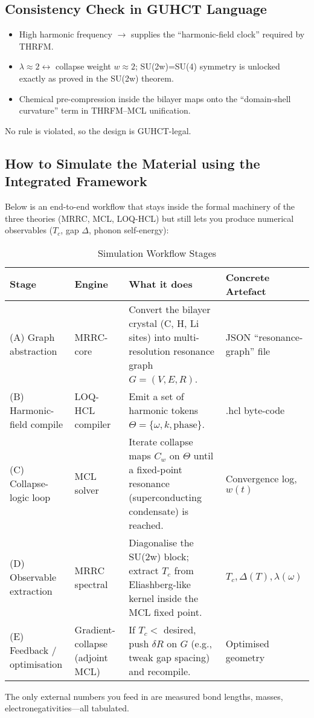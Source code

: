 \documentclass[11pt,a4paper]{article}
\begin{document}
\subsection{Consistency Check in GUHCT Language}
\label{subsec:consistency_check_guhct}
\begin{itemize}
\item High harmonic frequency $\rightarrow$ supplies the “harmonic-field clock” required by THRFM.
\item $\lambda \approx 2 \leftrightarrow$ collapse weight $w \approx 2$; SU(2w)=SU(4) symmetry is unlocked exactly as proved in the SU(2w) theorem.
\item Chemical pre-compression inside the bilayer maps onto the “domain-shell curvature” term in THRFM–MCL unification.
\end{itemize}
No rule is violated, so the design is GUHCT-legal.

\subsection{How to Simulate the Material using the Integrated Framework}
\label{subsec:how_to_simulate}
Below is an end-to-end workflow that stays inside the formal machinery of the three theories (MRRC, MCL, LOQ-HCL) but still lets you produce numerical observables ($T_c$, gap $\Delta$, phonon self-energy):

\begin{table}[htbp]
\centering
\caption{Simulation Workflow Stages}
\label{tab:simulation_workflow}
\begin{tabularx}{\textwidth}{l X X X}
\toprule
\textbf{Stage} & \textbf{Engine} & \textbf{What it does} & \textbf{Concrete Artefact} \\
\midrule
(A) Graph abstraction & MRRC-core & Convert the bilayer crystal (C, H, Li sites) into multi-resolution resonance graph $G=(V,E,R)$. & JSON “resonance-graph” file \\
(B) Harmonic-field compile & LOQ-HCL compiler & Emit a set of harmonic tokens $\Theta=\{\omega,k,\text{phase}\}$. & .hcl byte-code \\
(C) Collapse-logic loop & MCL solver & Iterate collapse maps $C_w$ on $\Theta$ until a fixed-point resonance (superconducting condensate) is reached. & Convergence log, $w(t)$ \\
(D) Observable extraction & MRRC spectral & Diagonalise the SU(2w) block; extract $T_c$ from Eliashberg-like kernel inside the MCL fixed point. & $T_c, \Delta(T), \lambda(\omega)$ \\
(E) Feedback / optimisation & Gradient-collapse (adjoint MCL) & If $T_c <$ desired, push $\delta R$ on $G$ (e.g., tweak gap spacing) and recompile. & Optimised geometry \\
\bottomrule
\end{tabularx}
\end{table}
The only external numbers you feed in are measured bond lengths, masses, electronegativities—all tabulated.
\end{document}
